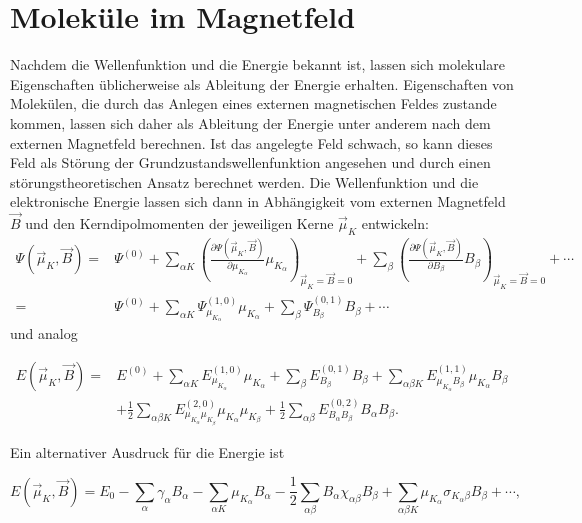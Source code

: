 \section{Moleküle im Magnetfeld}
Nachdem die Wellenfunktion und die Energie bekannt ist, lassen sich molekulare Eigenschaften üblicherweise als Ableitung der Energie erhalten. Eigenschaften von Molekülen, die durch das Anlegen eines externen magnetischen Feldes zustande kommen, lassen sich daher als Ableitung der Energie unter anderem nach dem externen Magnetfeld berechnen. Ist das angelegte Feld schwach, so kann dieses Feld als Störung der Grundzustandswellenfunktion angesehen und durch einen störungstheoretischen Ansatz berechnet werden. Die Wellenfunktion und die elektronische Energie lassen sich dann in Abhängigkeit vom externen Magnetfeld $\vec{B}$ und den Kerndipolmomenten der jeweiligen Kerne $\vec{\mu}_K$ entwickeln:\supercite{ditchfield1974self} 
\begin{equation}
\begin{aligned}
\Psi(\vec{\mu}_K,\vec{B})=&\Psi^{(0)}+\sum_{\alpha K}\left(\frac{\partial\Psi(\vec{\mu}_K,\vec{B})}{\partial \mu_{K_\alpha}}\mu_{K_\alpha}\right)_{\vec{\mu}_K=\vec{B}=0}+\sum_\beta\left(\frac{\partial\Psi(\vec{\mu}_K,\vec{B})}{\partial B_\beta}B_\beta\right)_{\vec{\mu}_K=\vec{B}=0}+\cdots\\
=&\Psi^{(0)}+\sum_{\alpha K}\Psi_{\mu_{K_\alpha}}^{(1,0)}\mu_{K_\alpha}+\sum_\beta\Psi_{B_\beta}^{(0,1)}B_\beta+\cdots
\end{aligned}
\end{equation}
und analog

\begin{equation}\label{eq:evonbmu0}
\begin{aligned}
E(\vec{\mu}_K,\vec{B})=&E^{(0)}+\sum_{\alpha K} E^{(1,0)}_{\mu_{K_\alpha}} \mu_{K_\alpha}+\sum_\beta E^{(0,1)}_{B_\beta} B_\beta+\sum_{\alpha\beta K} E^{(1,1)}_{\mu_{K_\alpha}B_\beta} \mu_{K_\alpha}B_\beta\\
&+\frac{1}{2}\sum_{\alpha\beta K} E^{(2,0)}_{\mu_{K_\alpha}\mu_{K_\beta}}\mu_{K_\alpha}\mu_{K_\beta}+\frac{1}{2}\sum_{\alpha\beta} E^{(0,2)}_{B_\alpha B_\beta}B_\alpha B_\beta.
\end{aligned}
\end{equation}

Ein alternativer Ausdruck für die Energie ist

\begin{equation}\label{eq:evonbmu}
 E(\vec{\mu}_K,\vec{B})=E_0-\sum_\alpha \gamma_\alpha B_\alpha-\sum_{\alpha K}\mu_{K_\alpha}B_\alpha-\frac{1}{2}\sum_{\alpha\beta}B_\alpha\chi_{\alpha\beta} B_\beta+\sum_{\alpha\beta K}\mu_{K_\alpha}\sigma_{K_\alpha \beta}B_\beta+\cdots, 
\end{equation}

